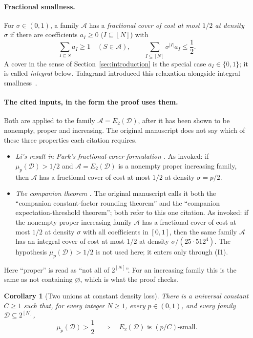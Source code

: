 \documentclass[11pt,letterpaper]{article}
\newtheorem{corollary}[theorem]{Corollary}
\theoremstyle{definition}
\theoremstyle{remark}
\numberwithin{equation}{section}
\begin{document}
\paragraph{Fractional smallness.}
For $\sigma\in(0,1)$, a family $\mathcal A$ has a \emph{fractional cover
of cost at most $1/2$ at density $\sigma$} if there are coefficients
$a_I\ge0$ ($I\subseteq[N]$) with
\[
\sum_{I\subseteq S}a_I\ge1\quad(S\in\mathcal A),
\qquad
\sum_{I\subseteq[N]}\sigma^{|I|}a_I\le\frac12.
\]
A cover in the sense of Section~\ref{sec:introduction} is the special case
$a_I\in\{0,1\}$; it is called \emph{integral} below. Talagrand introduced
this relaxation alongside integral
smallness~\cite[Sections~6 and~7]{Talagrand10}.

\paragraph{The cited inputs, in the form the proof uses them.}
Both are applied to the family $\mathcal A=E_2(\mathcal D)$, after it has
been shown to be nonempty, proper and increasing. The original manuscript
does not say which of these three properties each citation requires.
\begin{itemize}
\item[(I1)] \emph{Li's result \cite[Corollary~3.1]{Li26} in Park's
fractional-cover formulation \cite[Theorem~3.4]{Park26}.} As invoked: if
$\mu_p(\mathcal D)>1/2$ and $\mathcal A=E_2(\mathcal D)$ is a nonempty
proper increasing family, then $\mathcal A$ has a fractional cover of cost
at most $1/2$ at density $\sigma=p/2$.
\item[(I2)] \emph{The companion theorem
\cite[Theorem~1.1]{OpenAIThreshold26}.} The original manuscript calls it
both the ``companion constant-factor rounding theorem'' and the
``companion expectation-threshold theorem''; both refer to this one
citation. As invoked: if the nonempty proper increasing family
$\mathcal A$ has a fractional cover of cost at most $1/2$ at density
$\sigma$ with all coefficients in $[0,1]$, then the same family
$\mathcal A$ has an integral cover of cost at most $1/2$ at density
$\sigma/(25\cdot512^4)$. The hypothesis $\mu_p(\mathcal D)>1/2$ is not
used here; it enters only through (I1).
\end{itemize}
Here ``proper'' is read as ``not all of $2^{[N]}$''. For an increasing
family this is the same as not containing $\varnothing$, which is what the
proof checks.

\begin{corollary}[Two unions at constant density loss]
\label{cor:two-union}
There is a universal constant $C\ge1$ such that, for every integer $N\ge1$,
every $p\in(0,1)$, and every family $\mathcal D\subseteq2^{[N]}$,
\[
\mu_p(\mathcal D)>\frac12
\quad\Longrightarrow\quad
E_2(\mathcal D)\text{ is }(p/C)\text{-small}.
\]
\end{corollary}
\end{document}
